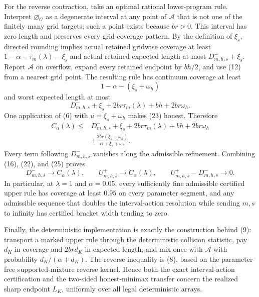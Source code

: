 For the reverse contraction, take an optimal rational lower-program
rule.  Interpret \(\varnothing_G\) as a degenerate interval at any
point of \(\mathcal A\) that is not one of the finitely many grid
targets; such a point exists because \(br>0\).  This interval has zero
length and preserves every grid-coverage pattern.  By the definition
of \(\xi_s\), directed rounding implies actual retained gridwise
coverage at least \(1-\alpha-\tau_m(\lambda)-\xi_s\) and actual retained
expected length at most \(D_{m,h,s}^-+\xi_s\).  Report
\(\mathcal A\) on overflow, expand every retained endpoint by
\(bh/2\), and use (12) from a nearest grid point.  The resulting rule
has continuum coverage at least
\[
 1-\alpha-(\xi_s+\omega_h)
 \tag{23}
\]
and worst expected length at most
\[
 D_{m,h,s}^-+\xi_s+2br\tau_m(\lambda)+bh+2br\omega_h.
 \tag{24}
\]
One application of (6) with \(u=\xi_s+\omega_h\) makes (23) honest.
Therefore
\[
\begin{aligned}
 C_\alpha(\lambda)
 \le{}&D_{m,h,s}^-+\xi_s+2br\tau_m(\lambda)+bh+2br\omega_h\\
 &+\frac{2br(\xi_s+\omega_h)}
 {\alpha+\xi_s+\omega_h}.
\end{aligned}
 \tag{25}
\]
Every term following \(D_{m,h,s}^-\) vanishes along the admissible
refinement.  Combining (16), (22), and (25) proves
\[
 D_{m,h,s}^-\to C_\alpha(\lambda),\qquad
 U_{m,h,s}^+\to C_\alpha(\lambda),\qquad
 U_{m,h,s}^+-D_{m,h,s}^-\to0.
 \tag{26}
\]
In particular, at \(\lambda=1\) and \(\alpha=0.05\), every
sufficiently fine admissible certified upper rule has coverage at least
\(0.95\) on every parameter segment, and any admissible sequence that
doubles the interval-action resolution while sending \(m,s\) to
infinity has certified bracket width tending to zero.

Finally, the deterministic implementation is exactly the construction
behind (9): transport a marked upper rule through the deterministic
collision statistic, pay \(d_K\) in coverage and \(2brd_K\) in
expected length, and mix once with \(\mathcal A\) with probability
\(d_K/(\alpha+d_K)\).  The reverse inequality is (8), based on the
parameter-free supported-mixture reverse kernel.  Hence both the exact
interval-action certification and the two-sided honest-minimax
transfer concern the realized sharp endpoint \(L_K\), uniformly over
all legal deterministic arrays.

